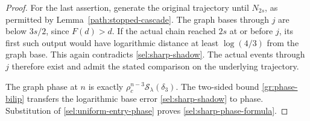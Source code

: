 \begin{proof}
For the last assertion, generate the original trajectory until
$N_{2s}$, as permitted by Lemma~\ref{path:stopped-cascade}.
The graph bases through $j$ are below $3s/2$, since $F(d)>d$.
If the actual chain reached $2s$ at or before $j$, its first such
output would have logarithmic distance at least $\log(4/3)$ from
the graph base. This again contradicts \eqref{sel:sharp-shadow}.
The actual events through $j$ therefore exist and admit the stated
comparison on the underlying trajectory.

The graph phase at $n$ is exactly
$\rho_c^{n-3}\mathcal S_\lambda(\delta_3)$.
The two-sided bound \eqref{gr:phase-bilip} transfers the logarithmic
base error \eqref{sel:sharp-shadow} to phase. Substitution of
\eqref{sel:uniform-entry-phase} proves \eqref{sel:sharp-phase-formula}.
\end{proof}
